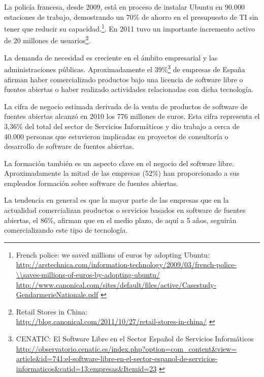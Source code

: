 La policía francesa, desde 2009, está en proceso de instalar Ubuntu en 90.000
estaciones de trabajo, demostrando un 70\% de ahorro en el presupuesto de TI sin
tener que reducir su capacidad.\footnote{French police: we saved millions of euros by adopting Ubuntu:\\
\url{http://arstechnica.com/information-technology/2009/03/french-police-\\saves-millions-of-euros-by-adopting-ubuntu/}
\url{http://www.canonical.com/sites/default/files/active/Casestudy-GendarmerieNationale.pdf}
\label{ftn:ubuntufrenchpolice}}. En 2011 tuvo un importante incremento activo
de 20 millones de usuarios\footnote{Retail Stores in China:\\
\url{http://blog.canonical.com/2011/10/27/retail-stores-in-china/}
\label{ftn:ubuntum20million}}. 

La demanda de necesidad es creciente en el 
ámbito empresarial y las administraciones públicas. Aproximadamente el
39\%\footnote{CENATIC: El Software Libre en el Sector Español de Servicios
Informáticos\\
\url{http://observatorio.cenatic.es/index.php?option=com_content&view=
article&id=741:el-software-libre-en-el-sector-espanol-de-servicios-informaticos&catid=13:empresas&Itemid=23}
\label{ftn:ubuntustatsspain}} de
empresas de España afirman haber comercializado productos bajo una licencia 
de software libre o fuentes abiertas o haber realizado actividades 
relacionadas con dicha tecnología. 

La cifra de negocio estimada derivada de la
venta de productos de software de fuentes abiertas alcanzó en 2010 los 
776 millones de euros. Esta cifra representa el 3,36\% del total del sector de
Servicios Informáticos y dio trabajo a cerca de 40.000 personas que estuvieron
implicadas en proyectos de consultoría o desarrollo de software de fuentes 
abiertas.

La formación también es un aspecto clave en el negocio del software libre.
Aproximadamente la mitad de las empresas (52\%) han proporcionado a sus
empleados formación sobre software de fuentes abiertas.

La tendencia en general es que la mayor parte de las empresas que en la
actualidad comercializan productos o servicios basados en software de 
fuentes abiertas, el 86\%, afirman que en el medio plazo, de aquí a 5 años,
seguirán comercializando este tipo de tecnología. 

\newpage

